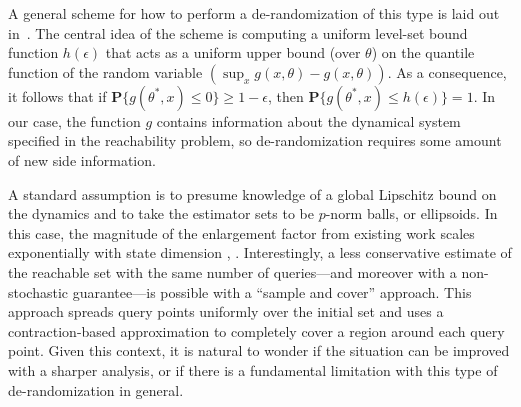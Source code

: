 \documentclass[letterpaper, 10 pt, conference]{ieeeconf}  %
\begin{document}
A general scheme for how to perform a de-randomization of this type is laid out in~\cite{esfahani2014performance}. The central idea of the scheme is computing a uniform level-set bound function $h(\epsilon)$ that acts as a uniform upper bound (over $\theta$) on the quantile function of the random variable $(\sup_x g(x,\theta) - g(x,\theta))$. As a consequence, it follows that if $\mathbf{P}\{ g(\theta^*,x) \le 0 \} \ge 1-\epsilon$, then 
$\mathbf{P}\{ g(\theta^*,x) \le h(\epsilon) \} =1$.
In our case, the function $g$ contains information about the dynamical system specified in the reachability problem,
so de-randomization requires some amount of new side information. 


A standard assumption %
is to presume knowledge of a global Lipschitz bound on the dynamics and to take the estimator sets to be $p$-norm balls, or ellipsoids. In this case, the magnitude of the enlargement factor from existing work scales exponentially with state dimension \cite[cf. Remark 3.9]{esfahani2014performance}, \cite[cf. Theorem 1]{lecchini2010optimization}.
Interestingly, a less conservative estimate of the reachable set with the same number of queries---and moreover with a non-stochastic guarantee---is possible with a ``sample and cover'' approach. This approach spreads query points uniformly over the initial set and uses a contraction-based approximation to completely cover a region around each query point.
Given this context, 
it is natural to wonder if the situation can be improved with a sharper analysis, or if there is a fundamental limitation with this type of de-randomization in general.

\end{document}
